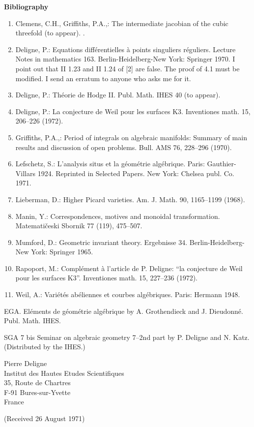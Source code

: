 \documentclass[10pt]{article}
\newcommand{\sourcebreak}{\clearpage}
\begin{document}
\begin{center}\bfseries Bibliography\end{center}
\begin{enumerate}[label=\arabic*.]
\item Clemens, C.H., Griffiths, P.A.,: The intermediate jacobian of the cubic threefold (to appear). .
\item Deligne, P.: Equations différentielles à points singuliers réguliers. Lecture Notes in mathematics 163. Berlin-Heidelberg-New York: Springer 1970. I point out that II 1.23 and II 1.24 of [2] are false. The proof of 4.1 must be modified. I send an erratum to anyone who asks me for it.
\item Deligne, P.: Théorie de Hodge II. Publ. Math. IHES 40 (to appear).
\item Deligne, P.: La conjecture de Weil pour les surfaces K3. Inventiones math. 15, 206--226 (1972).
\item Griffiths, P.A.,: Period of integrals on algebraic manifolds: Summary of main results and discussion of open problems. Bull. AMS 76, 228--296 (1970).
\item Lefschetz, S.: L'analysis situs et la géométrie algébrique. Paris: Gauthier-Villars 1924. Reprinted in Selected Papers. New York: Chelsea publ. Co. 1971.
\item Lieberman, D.: Higher Picard varieties. Am. J. Math. 90, 1165--1199 (1968).
\item Manin, Y.: Correspondences, motives and monoidal transformation. Matematičeski Sbornik 77 (119), 475--507.
\end{enumerate}

\sourcebreak
\begin{enumerate}[label=\arabic*.]
\setcounter{enumi}{8}
\item Mumford, D.: Geometric invariant theory. Ergebnisse 34. Berlin-Heidelberg-New York: Springer 1965.
\item Rapoport, M.: Complément à l'article de P. Deligne: ``la conjecture de Weil pour les surfaces K3''. Inventiones math. 15, 227--236 (1972).
\item Weil, A.: Variétés abéliennes et courbes algébriques. Paris: Hermann 1948.
\end{enumerate}

\noindent EGA. Eléments de géométrie algébrique by A. Grothendieck and J. Dieudonné. Publ. Math. IHES.

\noindent SGA 7 bis Seminar on algebraic geometry 7--2nd part by P. Deligne and N. Katz. (Distributed by the IHES.)

\begin{flushright}
Pierre Deligne\\
Institut des Hautes Etudes Scientifiques\\
35, Route de Chartres\\
F-91 Bures-sur-Yvette\\
France
\end{flushright}

\begin{center}
(Received 26 August 1971)
\end{center}

\end{document}
